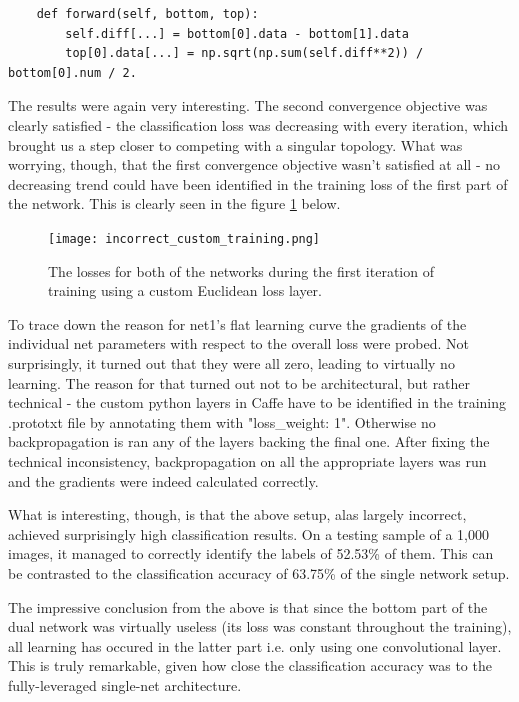 \documentclass[a4paper, 11pt]{article}
\numberwithin{equation}{section}
\begin{document}
	\begin{lstlisting}
	def forward(self, bottom, top):
	    self.diff[...] = bottom[0].data - bottom[1].data
	    top[0].data[...] = np.sqrt(np.sum(self.diff**2)) / bottom[0].num / 2.
	\end{lstlisting}
	
	The results were again very interesting. The second convergence objective was clearly satisfied - the classification loss was decreasing with every iteration, which brought us a step closer to competing with a singular topology. What was worrying, though, that the first convergence objective wasn't satisfied at all - no decreasing trend could have been identified in the training loss of the first part of the network. This is clearly seen in the figure \ref{fig:incorrect_custom_training} below.
	
	\begin{figure}[!h]
		\centering
		\texttt{[image: incorrect\_custom\_training.png]}
		\caption{\label{fig:incorrect_custom_training}{The losses for both of the networks during the first iteration of training using a custom Euclidean loss layer.}}
	\end{figure}

	To trace down the reason for net1's flat learning curve the gradients of the individual net parameters with respect to the overall loss were probed. Not surprisingly, it turned out that they were all zero, leading to virtually no learning. The reason for that turned out not to be architectural, but rather technical - the custom python layers in Caffe have to be identified in the training .prototxt file by annotating them with "loss\_weight: 1". Otherwise no backpropagation is ran any of the layers backing the final one. After fixing the technical inconsistency, backpropagation on all the appropriate layers was run and the gradients were indeed calculated correctly.
	
	What is interesting, though, is that the above setup, alas largely incorrect, achieved surprisingly high classification results. On a testing sample of a 1,000 images, it managed to correctly identify the labels of 52.53\% of them. This can be contrasted to the classification accuracy of 63.75\% of the single network setup.
	
	The impressive conclusion from the above is that since the bottom part of the dual network was virtually useless (its loss was constant throughout the training), all learning has occured in the latter part i.e. only using one convolutional layer. This is truly remarkable, given how close the classification accuracy was to the fully-leveraged single-net architecture.
	
\end{document}
